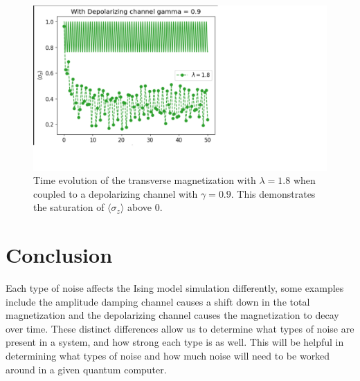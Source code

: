 \documentclass[12pt, twocolumn]{article}
\begin{document}
  \begin{figure}
    \centering
    \includegraphics[width=\linewidth]{images/LongRun.png}
    \caption{Time evolution of the transverse magnetization with \( \lambda = 1.8 \) when coupled to a depolarizing channel with \( \gamma = 0.9 \). This demonstrates the saturation of \( \langle \sigma_{z} \rangle \) above \( 0 \).%
      \label{fig:LongRun}}
  \end{figure}

  \section{Conclusion}
  Each type of noise affects the Ising model simulation differently, some examples include the amplitude damping channel causes a shift down in the total magnetization and the depolarizing channel causes the magnetization to decay over time. These distinct differences allow us to determine what types of noise are present in a system, and how strong each type is as well. This will be helpful in determining what types of noise and how much noise will need to be worked around in a given quantum computer.

  \printbibliography
\end{document}
